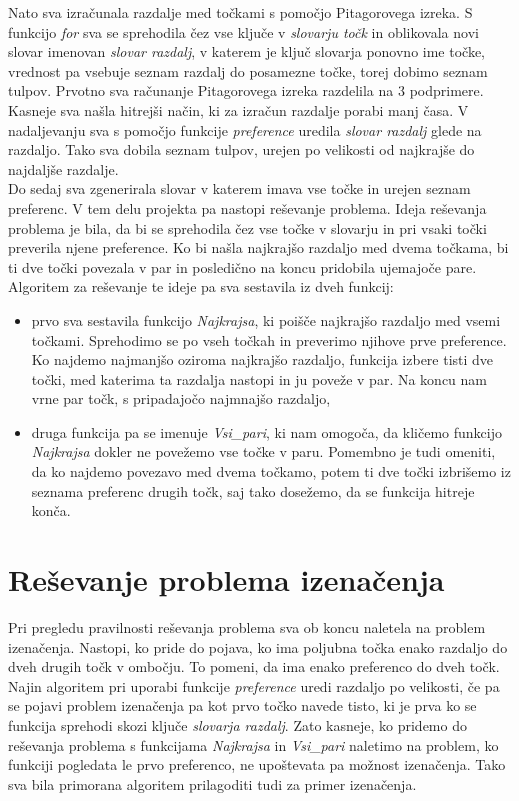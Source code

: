 \documentclass[12pt, a4paper]{article}
\begin{document}
Nato sva izračunala razdalje med točkami s pomočjo Pitagorovega izreka. S funkcijo \textit{for} sva se sprehodila čez vse ključe v \textit{slovarju točk} in oblikovala novi slovar imenovan \textit{slovar razdalj}, v katerem je ključ slovarja ponovno ime točke, vrednost pa vsebuje seznam razdalj do posamezne točke, torej dobimo seznam tulpov. Prvotno sva računanje Pitagorovega izreka  razdelila na 3 podprimere. Kasneje sva našla hitrejši način, ki za izračun razdalje porabi manj časa. V nadaljevanju sva s pomočjo funkcije \textit{preference} uredila \textit{slovar razdalj} glede na razdaljo. Tako sva dobila seznam tulpov, urejen po velikosti od najkrajše do najdaljše razdalje.  \\

Do sedaj sva zgenerirala slovar v katerem imava vse točke in urejen seznam preferenc.  V tem delu projekta pa nastopi reševanje problema. Ideja reševanja problema je bila, da bi se sprehodila čez vse točke v slovarju in pri vsaki točki preverila njene preference. Ko bi našla najkrajšo razdaljo med dvema točkama, bi ti dve točki povezala v par in posledično na koncu pridobila ujemajoče pare. Algoritem za reševanje te ideje pa sva sestavila iz dveh funkcij:
\begin{itemize}
	\item prvo sva sestavila funkcijo \textit{Najkrajsa}, ki poišče najkrajšo razdaljo med vsemi točkami. Sprehodimo se po vseh točkah in preverimo njihove prve preference. Ko najdemo najmanjšo oziroma najkrajšo razdaljo, funkcija izbere tisti dve točki, med katerima ta razdalja nastopi in ju poveže v par. Na koncu nam vrne par točk, s pripadajočo najmnajšo razdaljo,
	\item druga funkcija pa se imenuje \textit{Vsi_pari}, ki nam omogoča, da kličemo funkcijo \textit{Najkrajsa} dokler ne povežemo vse točke v paru. Pomembno je tudi omeniti, da ko najdemo povezavo med dvema točkamo, potem ti dve točki izbrišemo iz seznama preferenc drugih točk, saj tako dosežemo, da se funkcija hitreje konča.
\end{itemize}

\pagebreak
\section{Reševanje problema izenačenja}
Pri pregledu pravilnosti reševanja problema sva ob koncu naletela na problem izenačenja. Nastopi, ko pride do pojava, ko ima poljubna točka enako razdaljo do dveh drugih točk v ombočju. To pomeni, da ima enako preferenco do dveh točk. Najin algoritem pri uporabi funkcije \textit{preference} uredi razdaljo po velikosti, če pa se pojavi problem izenačenja pa kot prvo točko navede tisto, ki je prva ko se funkcija sprehodi skozi ključe \textit{slovarja razdalj}. Zato kasneje, ko pridemo do reševanja problema s funkcijama \textit{Najkrajsa} in \textit{Vsi_pari} naletimo na problem, ko funkciji pogledata le prvo preferenco, ne upoštevata pa možnost izenačenja. Tako sva bila primorana algoritem prilagoditi tudi za primer izenačenja. \\
\end{document}
